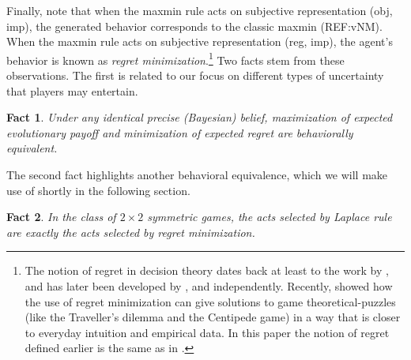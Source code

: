 \documentclass[fleqn,reqno,12pt]{article}
\theoremstyle{Satz}
\newtheorem{fact}{Fact}
\theoremstyle{Bsp}
\begin{document}
Finally, note that when the maxmin rule acts on subjective representation (obj, imp), the
generated behavior corresponds to the classic maxmin (REF:vNM). When the maxmin rule acts on
subjective representation (reg, imp), the agent's behavior is known as \textit{regret
  minimization}.\footnote{The notion of regret in decision theory dates back at least to the
  work by \citet{Savage1951:The-theory-of-s}, and has later been developed by \citet{bell82},
  \citet{fish82} and \citet{loosug82} independently. Recently,
  \citet{HalpernPass2012:Iterated-Regret} showed how the use of regret minimization can give
  solutions to game theoretical-puzzles (like the Traveller's dilemma and the Centipede game)
  in a way that is closer to everyday intuition and empirical data. In this paper the notion of
  regret defined earlier is the same as in \citet{HalpernPass2012:Iterated-Regret}.} Two facts
stem from these observations.  The first is related to our focus on different types of
uncertainty that players may entertain.
\begin{fact} \label{fact:maxEU-minReg} 
Under any identical precise (Bayesian) belief, maximization of expected evolutionary payoff and minimization of expected regret are behaviorally equivalent. %
\end{fact}
\noindent The second fact highlights another behavioral equivalence, which we will make use of shortly in the following section.
\begin{fact} \label{fact:equivalence2x2} In the class of $2 \times 2$ symmetric games, the acts
  selected by Laplace rule are exactly the acts selected by regret minimization.
\end{fact} 
\end{document}
